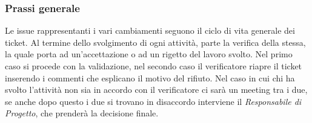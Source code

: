  \subsubsection{Prassi generale}
 Le issue rappresentanti i vari cambiamenti seguono il ciclo di vita generale dei ticket.
 Al termine dello svolgimento di ogni attività,  parte la verifica della stessa,  la quale porta ad un'accettazione o ad un rigetto
del lavoro svolto.  Nel primo caso si procede con la validazione, nel secondo caso il verificatore riapre il ticket inserendo i commenti
che esplicano il motivo del rifiuto. Nel caso in cui chi ha svolto l'attività non sia in accordo con il verificatore ci sarà un meeting tra i due, se anche
dopo questo i due si trovano in disaccordo interviene il \textit{Responsabile di Progetto}, che prenderà la decisione finale.